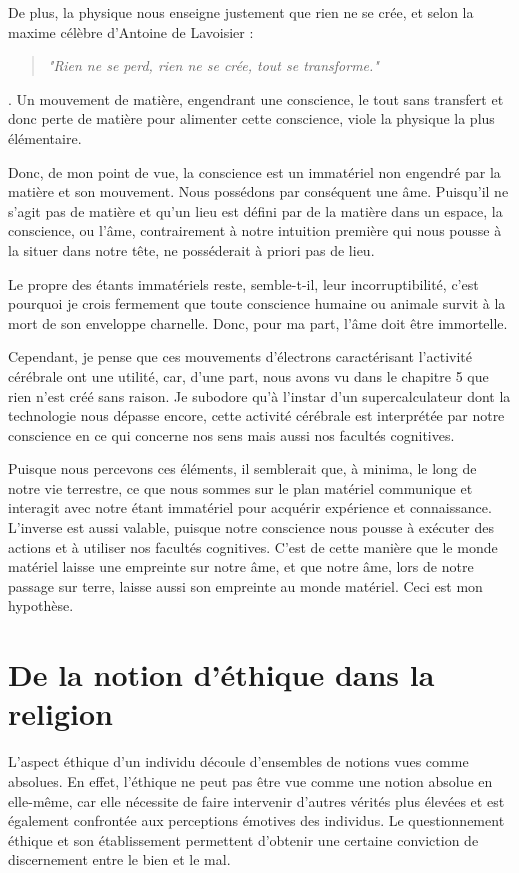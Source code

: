 De plus, la physique nous enseigne justement que rien ne se crée, et selon la maxime célèbre d'Antoine de Lavoisier : \begin{quote}\textit{"Rien ne se perd, rien ne se crée, tout se transforme."}\end{quote}. Un mouvement de matière, engendrant une conscience, le tout sans transfert et donc perte de matière pour alimenter cette conscience, viole la physique la plus élémentaire.

Donc, de mon point de vue, la conscience est un immatériel non engendré par la matière et son mouvement. Nous possédons par conséquent une âme. Puisqu'il ne s'agit pas de matière et qu'un lieu est défini par de la matière dans un espace, la conscience, ou l'âme, contrairement à notre intuition première qui nous pousse à la situer dans notre tête, ne posséderait à priori pas de lieu.

Le propre des étants immatériels reste, semble-t-il, leur incorruptibilité, c'est pourquoi je crois fermement que toute conscience humaine ou animale survit à la mort de son enveloppe charnelle. Donc, pour ma part, l'âme doit être immortelle.

Cependant, je pense que ces mouvements d'électrons caractérisant l'activité cérébrale ont une utilité, car, d'une part, nous avons vu dans le chapitre 5 que rien n'est créé sans raison. Je subodore qu'à l'instar d'un supercalculateur dont la technologie nous dépasse encore, cette activité cérébrale est interprétée par notre conscience en ce qui concerne nos sens mais aussi nos facultés cognitives.

Puisque nous percevons ces éléments, il semblerait que, à minima, le long de notre vie terrestre, ce que nous sommes sur le plan matériel communique et interagit avec notre étant immatériel pour acquérir expérience et connaissance. L'inverse est aussi valable, puisque notre conscience nous pousse à exécuter des actions et à utiliser nos facultés cognitives. C'est de cette manière que le monde matériel laisse une empreinte sur notre âme, et que notre âme, lors de notre passage sur terre, laisse aussi son empreinte au monde matériel. Ceci est mon hypothèse.

\chapter{De la notion d'éthique dans la religion}

L'aspect éthique d'un individu découle d'ensembles de notions vues comme absolues. En effet, l’éthique ne peut pas être vue comme une notion absolue en elle-même, car elle nécessite de faire intervenir d’autres vérités plus élevées et est également confrontée aux perceptions émotives des individus. Le questionnement éthique et son établissement permettent d’obtenir une certaine conviction de discernement entre le bien et le mal.

